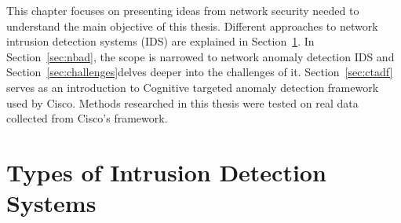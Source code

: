 \documentclass[thesis=B,english]{FITthesis}[2012/10/20]
\begin{document}
This chapter focuses on presenting ideas from network security needed to understand the main objective of this thesis.
Different approaches to network intrusion detection systems (IDS) are explained in Section~\ref{sec:ids}.
In Section~\ref{sec:nbad}, the scope is narrowed to network anomaly detection IDS and Section~\ref{sec:challenges}delves deeper into the challenges of it.
Section~\ref{sec:ctadf} serves as an introduction to Cognitive targeted anomaly detection framework used by Cisco.
Methods researched in this thesis were tested on real data collected from Cisco's framework. \\

\section{Types of Intrusion Detection Systems}\label{sec:ids}
\end{document}
